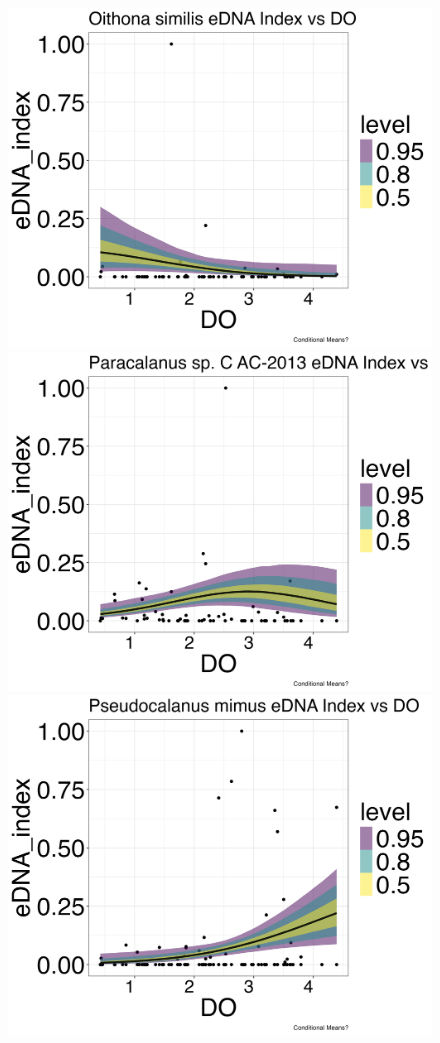 \documentclass[12pt,twoside]{reedthesis}
\begin{document}
{\begin{figure}[h]
\begin{center}
			\includegraphics[scale=0.25]{Osimilis_ZOIB_Means_noOut}
			\includegraphics[scale=0.25]{Paracalanus_ZOIB_Means_noOut}
			\includegraphics[scale=0.25]{Pmimus_ZOIB_Means_noOut}

\end{center}
\end{figure}}
\end{document}

